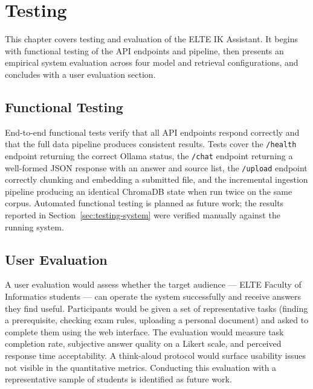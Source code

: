 \chapter{Testing}
\label{ch:testing}

This chapter covers testing and evaluation of the ELTE IK Assistant. It begins with functional testing of the API endpoints and pipeline, then presents an empirical system evaluation across four model and retrieval configurations, and concludes with a user evaluation section.

\section{Functional Testing}
\label{sec:testing-functional}

End-to-end functional tests verify that all API endpoints respond correctly and that the full data pipeline produces consistent results. Tests cover the \texttt{/health} endpoint returning the correct Ollama status, the \texttt{/chat} endpoint returning a well-formed JSON response with an answer and source list, the \texttt{/upload} endpoint correctly chunking and embedding a submitted file, and the incremental ingestion pipeline producing an identical ChromaDB state when run twice on the same corpus. Automated functional testing is planned as future work; the results reported in Section~\ref{sec:testing-system} were verified manually against the running system.

\section{User Evaluation}
\label{sec:testing-user}

A user evaluation would assess whether the target audience — ELTE Faculty of Informatics students — can operate the system successfully and receive answers they find useful. Participants would be given a set of representative tasks (finding a prerequisite, checking exam rules, uploading a personal document) and asked to complete them using the web interface. The evaluation would measure task completion rate, subjective answer quality on a Likert scale, and perceived response time acceptability. A think-aloud protocol would surface usability issues not visible in the quantitative metrics. Conducting this evaluation with a representative sample of students is identified as future work.

